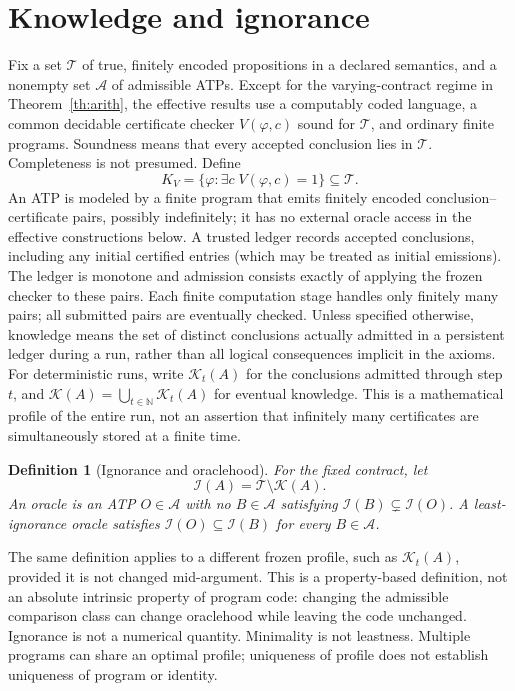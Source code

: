 \documentclass[11pt]{article}
\newtheorem{definition}[theorem]{Definition}
\newcommand{\T}{\mathcal T}\newcommand{\K}{\mathcal K}\newcommand{\I}{\mathcal I}\newcommand{\A}{\mathcal A}
\begin{document}
\section{Knowledge and ignorance}
Fix a set $\T$ of true, finitely encoded propositions in a declared semantics, and a nonempty set $\A$ of admissible ATPs. Except for the varying-contract regime in Theorem~\ref{th:arith}, the effective results use a computably coded language, a common decidable certificate checker $V(\varphi,c)$ sound for $\T$, and ordinary finite programs. Soundness means that every accepted conclusion lies in $\T$. Completeness is not presumed. Define
\[
K_V=\{\varphi:\exists c\; V(\varphi,c)=1\}\subseteq\T.
\]
An ATP is modeled by a finite program that emits finitely encoded conclusion--certificate pairs, possibly indefinitely; it has no external oracle access in the effective constructions below. A trusted ledger records accepted conclusions, including any initial certified entries (which may be treated as initial emissions). The ledger is monotone and admission consists exactly of applying the frozen checker to these pairs. Each finite computation stage handles only finitely many pairs; all submitted pairs are eventually checked. Unless specified otherwise, knowledge means the set of distinct conclusions actually admitted in a persistent ledger during a run, rather than all logical consequences implicit in the axioms. For deterministic runs, write $\K_t(A)$ for the conclusions admitted through step $t$, and $\K(A)=\bigcup_{t\in\mathbb N}\K_t(A)$ for eventual knowledge. This is a mathematical profile of the entire run, not an assertion that infinitely many certificates are simultaneously stored at a finite time.

\begin{definition}[Ignorance and oraclehood]\label{def:oracle}
For the fixed contract, let
\[
\I(A)=\T\setminus\K(A).
\]
An \emph{oracle} is an ATP $O\in\A$ with no $B\in\A$ satisfying $\I(B)\subsetneq\I(O)$. A \emph{least-ignorance oracle} satisfies $\I(O)\subseteq\I(B)$ for every $B\in\A$.
\end{definition}
The same definition applies to a different frozen profile, such as $\K_t(A)$, provided it is not changed mid-argument. This is a property-based definition, not an absolute intrinsic property of program code: changing the admissible comparison class can change oraclehood while leaving the code unchanged. Ignorance is not a numerical quantity. Minimality is not leastness. Multiple programs can share an optimal profile; uniqueness of profile does not establish uniqueness of program or identity.
\end{document}
